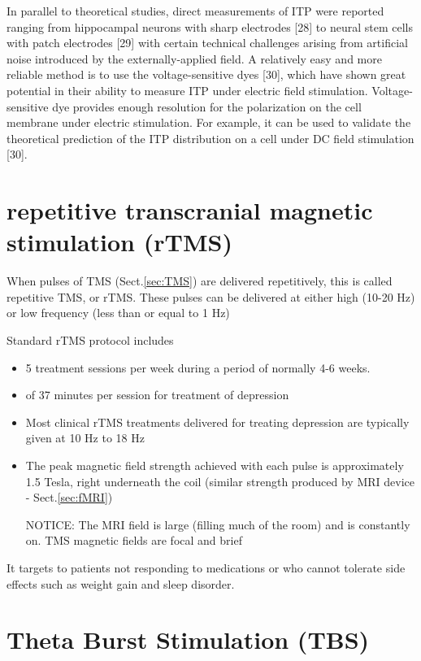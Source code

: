 In parallel to theoretical studies, direct measurements of ITP were reported
ranging from hippocampal neurons with sharp electrodes [28] to neural stem cells
with patch electrodes [29] with certain technical challenges arising from
artificial noise introduced by the externally-applied field. A relatively easy
and more reliable method is to use the voltage-sensitive dyes [30], which have
shown great potential in their ability to measure ITP under electric field
stimulation. Voltage-sensitive dye provides enough resolution for the
polarization on the cell membrane under electric stimulation. For example, it
can be used to validate the theoretical prediction of the ITP distribution on a
cell under DC field stimulation [30].

\section{repetitive transcranial magnetic stimulation (rTMS)}
\label{sec:rTMS}

When pulses of TMS (Sect.\ref{sec:TMS}) are delivered repetitively, this is
called repetitive TMS, or rTMS. 
These pulses can be delivered at either high (10-20 Hz) or low frequency (less
than or equal to 1 Hz) 


Standard rTMS protocol includes 
\begin{itemize} 
  \item 5 treatment sessions per week during a period of normally 4-6
  weeks.
  \item of 37 minutes per session for treatment of depression
  
  \item Most clinical rTMS treatments delivered for treating depression are
  typically given at 10 Hz to 18 Hz
  
  \item The peak magnetic field strength achieved with each pulse is
  approximately 1.5 Tesla, right underneath the coil (similar strength produced
  by MRI device - Sect.\ref{sec:fMRI})
  
  NOTICE: The MRI field is large (filling much of the room) and is constantly
  on. TMS magnetic fields are focal and brief
  
  
\end{itemize} 
It targets to patients not responding to medications or who cannot tolerate side
effects such as weight gain and sleep disorder.

\section{Theta Burst Stimulation (TBS) }
\label{sec:Theta-Burst-Stimulation}
\label{sec:TBS}

